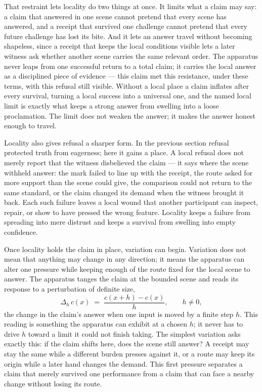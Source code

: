 That restraint lets locality do two things at once. It limits what a claim may say: a claim that answered in one scene cannot pretend that every scene has answered, and a receipt that survived one challenge cannot pretend that every future challenge has lost its bite. And it lets an answer travel without becoming shapeless, since a receipt that keeps the local conditions visible lets a later witness ask whether another scene carries the same relevant order. The apparatus never leaps from one successful return to a total claim; it carries the local answer as a disciplined piece of evidence --- this claim met this resistance, under these terms, with this refusal still visible. Without a local place a claim inflates after every survival, turning a local success into a universal one, and the named local limit is exactly what keeps a strong answer from swelling into a loose proclamation. The limit does not weaken the answer; it makes the answer honest enough to travel.

Locality also gives refusal a sharper form. In the previous section refusal protected truth from eagerness; here it gains a place. A local refusal does not merely report that the witness disbelieved the claim --- it says where the scene withheld answer: the mark failed to line up with the receipt, the route asked for more support than the scene could give, the comparison could not return to the same standard, or the claim changed its demand when the witness brought it back. Each such failure leaves a local wound that another participant can inspect, repair, or show to have pressed the wrong feature. Locality keeps a failure from spreading into mere distrust and keeps a survival from swelling into empty confidence.

Once locality holds the claim in place, variation can begin. Variation does not mean that anything may change in any direction; it means the apparatus can alter one pressure while keeping enough of the route fixed for the local scene to answer. The apparatus tanges the claim at the bounded scene and reads its response to a perturbation of definite size,
\[ \Delta_h\, c(x) \;=\; \frac{c(x+h) - c(x)}{h}, \qquad h \neq 0, \]
the change in the claim's answer when one input is moved by a finite step $h$. This reading is something the apparatus can exhibit at a chosen $h$; it never has to drive $h$ toward a limit it could not finish taking. The simplest variation asks exactly this: if the claim shifts here, does the scene still answer? A receipt may stay the same while a different burden presses against it, or a route may keep its origin while a later hand changes the demand. This first pressure separates a claim that merely survived one performance from a claim that can face a nearby change without losing its route.

